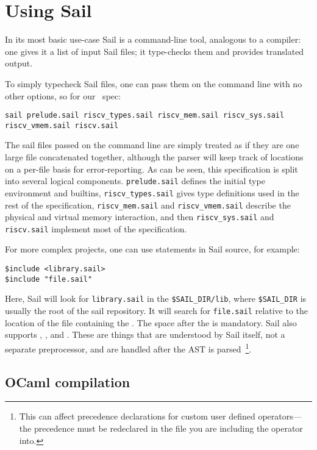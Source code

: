 \section{Using Sail}
\label{sec:usage}

In its most basic use-case Sail is a command-line tool, analogous to
a compiler: one gives it a list of input Sail files; it type-checks
them and provides translated output.

To simply typecheck Sail files, one can pass them on the command line
with no other options, so for our \riscv\ spec:
\begin{verbatim}
sail prelude.sail riscv_types.sail riscv_mem.sail riscv_sys.sail riscv_vmem.sail riscv.sail
\end{verbatim}
The sail files passed on the command line are simply treated as if
they are one large file concatenated together, although the parser
will keep track of locations on a per-file basis for
error-reporting. As can be seen, this specification is split into
several logical components. \verb+prelude.sail+ defines the initial
type environment and builtins, \verb+riscv_types.sail+ gives type
definitions used in the rest of the specification, \verb+riscv_mem.sail+
and \verb+riscv_vmem.sail+ describe the physical and virtual memory
interaction, and then \verb+riscv_sys.sail+ and \verb+riscv.sail+
implement most of the specification.

For more complex projects, one can use  statements in
Sail source, for example:
\begin{lstlisting}
$include <library.sail>
$include "file.sail"
\end{lstlisting}

Here, Sail will look for \verb+library.sail+ in the
\verb+$SAIL_DIR/lib+, where \verb+$SAIL_DIR+ is usually the root of
the sail repository. It will search for \verb+file.sail+ relative to
the location of the file containing the . The space after
the  is mandatory. Sail also supports ,
, and . These are things that are understood by
Sail itself, not a separate preprocessor, and are handled after the
AST is parsed~\footnote{This can affect precedence declarations for custom user defined operators---the precedence must be redeclared in the file you are including the operator into.}.

\subsection{OCaml compilation}

